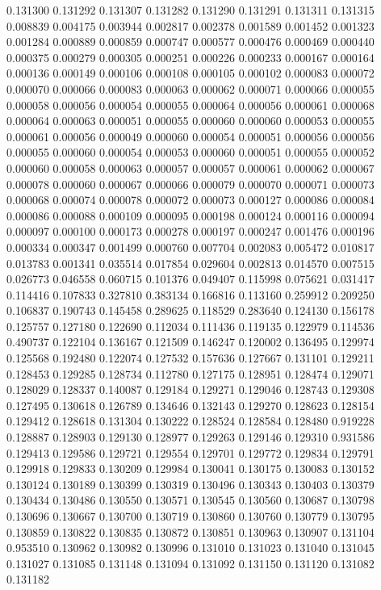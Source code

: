 0.131300
0.131292
0.131307
0.131282
0.131290
0.131291
0.131311
0.131315
0.008839
0.004175
0.003944
0.002817
0.002378
0.001589
0.001452
0.001323
0.001284
0.000889
0.000859
0.000747
0.000577
0.000476
0.000469
0.000440
0.000375
0.000279
0.000305
0.000251
0.000226
0.000233
0.000167
0.000164
0.000136
0.000149
0.000106
0.000108
0.000105
0.000102
0.000083
0.000072
0.000070
0.000066
0.000083
0.000063
0.000062
0.000071
0.000066
0.000055
0.000058
0.000056
0.000054
0.000055
0.000064
0.000056
0.000061
0.000068
0.000064
0.000063
0.000051
0.000055
0.000060
0.000060
0.000053
0.000055
0.000061
0.000056
0.000049
0.000060
0.000054
0.000051
0.000056
0.000056
0.000055
0.000060
0.000054
0.000053
0.000060
0.000051
0.000055
0.000052
0.000060
0.000058
0.000063
0.000057
0.000057
0.000061
0.000062
0.000067
0.000078
0.000060
0.000067
0.000066
0.000079
0.000070
0.000071
0.000073
0.000068
0.000074
0.000078
0.000072
0.000073
0.000127
0.000086
0.000084
0.000086
0.000088
0.000109
0.000095
0.000198
0.000124
0.000116
0.000094
0.000097
0.000100
0.000173
0.000278
0.000197
0.000247
0.001476
0.000196
0.000334
0.000347
0.001499
0.000760
0.007704
0.002083
0.005472
0.010817
0.013783
0.001341
0.035514
0.017854
0.029604
0.002813
0.014570
0.007515
0.026773
0.046558
0.060715
0.101376
0.049407
0.115998
0.075621
0.031417
0.114416
0.107833
0.327810
0.383134
0.166816
0.113160
0.259912
0.209250
0.106837
0.190743
0.145458
0.289625
0.118529
0.283640
0.124130
0.156178
0.125757
0.127180
0.122690
0.112034
0.111436
0.119135
0.122979
0.114536
0.490737
0.122104
0.136167
0.121509
0.146247
0.120002
0.136495
0.129974
0.125568
0.192480
0.122074
0.127532
0.157636
0.127667
0.131101
0.129211
0.128453
0.129285
0.128734
0.112780
0.127175
0.128951
0.128474
0.129071
0.128029
0.128337
0.140087
0.129184
0.129271
0.129046
0.128743
0.129308
0.127495
0.130618
0.126789
0.134646
0.132143
0.129270
0.128623
0.128154
0.129412
0.128618
0.131304
0.130222
0.128524
0.128584
0.128480
0.919228
0.128887
0.128903
0.129130
0.128977
0.129263
0.129146
0.129310
0.931586
0.129413
0.129586
0.129721
0.129554
0.129701
0.129772
0.129834
0.129791
0.129918
0.129833
0.130209
0.129984
0.130041
0.130175
0.130083
0.130152
0.130124
0.130189
0.130399
0.130319
0.130496
0.130343
0.130403
0.130379
0.130434
0.130486
0.130550
0.130571
0.130545
0.130560
0.130687
0.130798
0.130696
0.130667
0.130700
0.130719
0.130860
0.130760
0.130779
0.130795
0.130859
0.130822
0.130835
0.130872
0.130851
0.130963
0.130907
0.131104
0.953510
0.130962
0.130982
0.130996
0.131010
0.131023
0.131040
0.131045
0.131027
0.131085
0.131148
0.131094
0.131092
0.131150
0.131120
0.131082
0.131182
